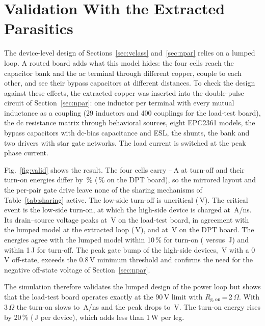 \documentclass[conference]{IEEEtran}
\begin{document}
\section{Validation With the Extracted Parasitics}\label{sec:valid}
The device-level design of Sections~\ref{sec:vclass} and~\ref{sec:npar} relies on a lumped loop. A routed board adds what this model hides: the four cells reach the capacitor bank and the ac terminal through different copper, couple to each other, and see their bypass capacitors at different distances. To check the design against these effects, the extracted copper was inserted into the double-pulse circuit of Section~\ref{sec:npar}: one inductor per terminal with every mutual inductance as a coupling (29 inductors and 400 couplings for the load-test board), the dc resistance matrix through behavioral sources, eight EPC2361 models, the bypass capacitors with dc-bias capacitance and ESL, the shunts, the bank and two drivers with star gate networks. The load current is switched at the peak phase current.

Fig.~\ref{fig:valid} shows the result. The four cells carry \QsIminLoad--\QsImaxLoad\,A at turn-off and their turn-on energies differ by \QsShareEonLoad\,\% (\QsShareEonDpt\,\% on the DPT board), so the mirrored layout and the per-pair gate drive leave none of the sharing mechanisms of Table~\ref{tab:sharing} active. The low-side turn-off is uncritical (\QsVlLoad\,V). The critical event is the low-side turn-on, at which the high-side device is charged at \QsDidtLoad\,A/ns. Its drain--source voltage peaks at \QsVhLoad\,V on the load-test board, in agreement with the lumped model at the extracted loop (\QsLumVhLoad\,V), and at \QsVhDpt\,V on the DPT board. The energies agree with the lumped model within 10\,\% for turn-on (\QsEonLoad{} versus \QsLumEonLoad\,\textmu J) and within 1\,\textmu J for turn-off. The peak gate bump of the high-side devices, \QsBumpLoad\,V with a 0\,V off-state, exceeds the 0.8\,V minimum threshold and confirms the need for the negative off-state voltage of Section~\ref{sec:npar}.

The simulation therefore validates the lumped design of the power loop but shows that the load-test board operates exactly at the 90\,V limit with $R_\mathrm{g,on}$\,=\,2\,$\Omega$. With 3\,$\Omega$ the turn-on slows to \QsDidtLoadRgThree\,A/ns and the peak drops to \QsVhLoadRgThree\,V. The turn-on energy rises by 20\,\% (\QsEonLoadRgThree\,\textmu J per device), which adds less than 1\,W per leg.
\end{document}
